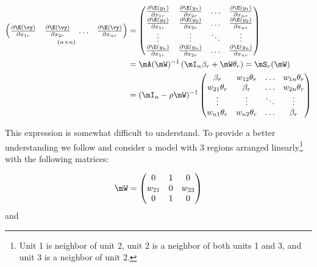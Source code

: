 \documentclass[english,12pt]{book}\usepackage[]{graphicx}\usepackage[]{xcolor}
\begin{document}
\begin{equation}\label{eq:matrix_marginal_effects}
\begin{aligned}
 \underset{(n \times n)}{\begin{pmatrix}
  \frac{\partial \E(\vy)}{\partial x_{1r}} & \frac{\partial \E(\vy)}{\partial x_{2r}} & \hdots & \frac{\partial \E(\vy)}{\partial x_{nr}} 
   \end{pmatrix}} & = 
  \begin{pmatrix}
  \frac{\partial \E(y_1)}{\partial x_{1r}} & \frac{\partial \E(y_1)}{\partial x_{2r}} & \hdots & \frac{\partial \E(y_1)}{\partial x_{nr}} \\
  \frac{\partial \E(y_2)}{\partial x_{1r}} & \frac{\partial \E(y_2)}{\partial x_{2r}} & \hdots & \frac{\partial \E(y_2)}{\partial x_{nr}} \\
  \vdots & \vdots & \ddots & \vdots \\
  \frac{\partial \E(y_n)}{\partial x_{1r}} & \frac{\partial \E(y_n)}{\partial x_{2r}} & \hdots & \frac{\partial \E(y_n)}{\partial x_{nr}} 
  \end{pmatrix} \\
  & = \mA(\mW)^{-1}\left(\mI_n\beta_r + \mW\theta_r\right) = \mS_r(\mW) \\
  & = (\mI_n - \rho\mW)^{-1}
  \begin{pmatrix}
    \beta_r  & w_{12} \theta_r  & \hdots & w_{1n}\theta_r \\
    w_{21} \theta_r  & \beta_r   & \hdots & w_{2n}\theta_r \\
    \vdots & \vdots & \ddots & \vdots \\
    w_{n1} \theta_r  & w_{n2} \theta_r  & \hdots  & \beta_r \\
  \end{pmatrix}
\end{aligned}  
\end{equation}

This expression is somewhat difficult to understand. To provide a better understanding we follow \cite{elhorst2010applied} and consider a model with 3 regions arranged linearly\footnote{Unit 1 is neighbor of unit 2, unit 2 is a neighbor of both units 1 and 3, and unit 3 is a neighbor of unit 2.} with the following matrices:

\begin{equation}\label{eq:w_mat_ex_spill}
  \mW = \begin{pmatrix}
          0      & 1 & 0 \\
          w_{21} & 0 & w_{23} \\
          0      & 1 & 0
        \end{pmatrix}
\end{equation}
%
and
\end{document}
